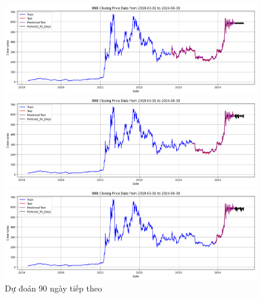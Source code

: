 \documentclass[conference]{IEEEtran}
\begin{document}
	\begin{figure}[H]
		\centering
		\begin{minipage}{0.15\textwidth}
			\centering
			\includegraphics[width=1\textwidth]{Figure/RandomForest_BNB_90days_73.png}
		\end{minipage}
		\hfill
		\begin{minipage}{0.15\textwidth}
			\centering
			\includegraphics[width=1\textwidth]{Figure/RandomForest_BNB_90days_82.png}
		\end{minipage}
		\hfill
		\begin{minipage}{0.15\textwidth}
			\centering
			\includegraphics[width=1\textwidth]{Figure/RandomForest_BNB_90days_91.png}
		\end{minipage}
		\caption{Dự đoán 90 ngày tiếp theo}
		\label{fig:1}
	\end{figure}
	
\end{document}
